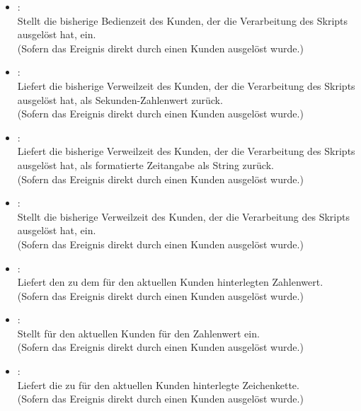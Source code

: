 \begin{itemize}
\item
{}:\\
Stellt die bisherige Bedienzeit des Kunden, der die Verarbeitung des Skripts ausgelöst hat, ein.\\
(Sofern das Ereignis direkt durch einen Kunden ausgelöst wurde.)

\item
{}:\\
Liefert die bisherige Verweilzeit des Kunden, der die Verarbeitung des Skripts ausgelöst hat, als Sekunden-Zahlenwert zurück.\\
(Sofern das Ereignis direkt durch einen Kunden ausgelöst wurde.)

\item
{}:\\
Liefert die bisherige Verweilzeit des Kunden, der die Verarbeitung des Skripts ausgelöst hat, als formatierte Zeitangabe als String zurück.\\
(Sofern das Ereignis direkt durch einen Kunden ausgelöst wurde.)

\item
{}:\\
Stellt die bisherige Verweilzeit des Kunden, der die Verarbeitung des Skripts ausgelöst hat, ein.\\
(Sofern das Ereignis direkt durch einen Kunden ausgelöst wurde.)

\item
{}:\\
Liefert den zu dem  für den aktuellen Kunden hinterlegten Zahlenwert.\\
(Sofern das Ereignis direkt durch einen Kunden ausgelöst wurde.)
  
\item
{}:\\
Stellt für den aktuellen Kunden für  den Zahlenwert  ein.\\
(Sofern das Ereignis direkt durch einen Kunden ausgelöst wurde.)

\item
{}:\\
Liefert die zu  für den aktuellen Kunden hinterlegte Zeichenkette.\\
(Sofern das Ereignis direkt durch einen Kunden ausgelöst wurde.)
  

\end{itemize}
